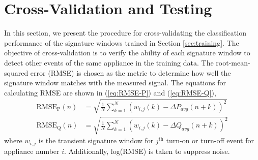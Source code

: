 \documentclass[conference]{IEEEtran}
\begin{document}
%





\section{Cross-Validation and Testing}\label{sec:cv}
In this section, we present the procedure for cross-validating the classification performance of the signature windows trained in Section \ref{sec:training}.  The objective of cross-validation is to verify the ability of each signature window to detect other events of the same appliance in the training data.  The root-mean-squared error (RMSE) is chosen as the metric to determine how well the signature window matches with the measured signal.  The equations for calculating RMSE are shown in (\ref{eq:RMSE-P}) and (\ref{eq:RMSE-Q}),
\begin{align}
\label{eq:RMSE-P}
\text{RMSE}_{\text{P}}(n) &= \sqrt{\frac{1}{N}\sum\limits_{k=1}^{N}(w_{i,j}(k) - \Delta P_{avg}(n+k))^2}\\
\label{eq:RMSE-Q}
\text{RMSE}_{\text{Q}}(n) &= \sqrt{\frac{1}{N}\sum\limits_{k=1}^{N}(w_{i,j}(k) - \Delta Q_{avg}(n+k))^2}
\end{align}
where $w_{i,j}$ is the transient signature window for $j^{\text{th}}$ turn-on or turn-off event for appliance number $i$.  Additionally, log(RMSE) is taken to suppress noise.  
\end{document}
